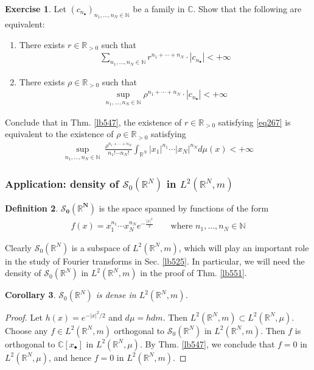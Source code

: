 \documentclass[12pt,b5paper,notitlepage]{article}
\theoremstyle{definition}
\newtheorem{df}{Definition}[subsection]
\newtheorem{exe}[df]{Exercise}
\theoremstyle{plain}
\newtheorem{co}[df]{Corollary}
\newcommand{\blt}{\bullet}
\newcommand{\Cbb}{\mathbb C}
\newcommand{\Nbb}{\mathbb N}
\newcommand{\Rbb}{\mathbb R}
\newcommand{\MS}{\mathcal S}
\numberwithin{equation}{section}
\begin{document}
\begin{exe}\label{lb554}
Let $(c_{n_\blt})_{n_1,\dots,n_N\in\Nbb}$ be a family in $\Cbb$. Show that the following are equivalent:
\begin{enumerate}[label=(\arabic*)]
\item There exists $r\in\Rbb_{>0}$ such that
\begin{align*}
\sum_{n_1,\dots,n_N\in\Nbb}r^{n_1+\cdots+n_N}\cdot |c_{n_\blt}|<+\infty
\end{align*}
\item There exists $\rho\in\Rbb_{>0}$ such that
\begin{align*}
\sup_{n_1,\dots,n_N\in\Nbb}\rho^{n_1+\cdots+n_N}\cdot |c_{n_\blt}|<+\infty
\end{align*}
\end{enumerate}
Conclude that in Thm. \ref{lb547}, the existence of $r\in\Rbb_{>0}$ satisfying \eqref{eq267} is equivalent to the existence of $\rho\in\Rbb_{>0}$ satisfying
\begin{align}
\sup_{n_1,\dots,n_N\in\Nbb}~\frac{\rho^{n_1+\cdots+n_N}}{n_1!\cdots n_N!}\int_{\Rbb^N}|x_1|^{n_1}\cdots|x_N|^{n_N}d\mu(x)<+\infty
\end{align}
\end{exe}


\subsubsection{Application: density of $\MS_0(\Rbb^N)$ in $L^2(\Rbb^N,m)$}



\begin{df}\label{lb549}
$\pmb{\MS_0(\Rbb^N)}$ \index{S0@$\MS_0(\Rbb^N)$} is the space spanned by functions of the form
\begin{align}\label{eq262}
f(x)=x_1^{n_1}\cdots x_N^{n_N}e^{-\frac{|x|^2}2}\qquad\text{where }n_1,\dots,n_N\in\Nbb
\end{align}
\end{df}


Clearly $\MS_0(\Rbb^N)$ is a subspace of $L^2(\Rbb^N,m)$, which will play an important role in the study of Fourier transforms in Sec. \ref{lb525}. In particular, we will need the density of $\MS_0(\Rbb^N)$ in $L^2(\Rbb^N,m)$ in the proof of Thm. \ref{lb551}.

\begin{co}\label{lb550}
$\MS_0(\Rbb^N)$ is dense in $L^2(\Rbb^N,m)$.
\end{co}


\begin{proof}
Let $h(x)=e^{-|x|^2/2}$ and $d\mu=hdm$. Then $L^2(\Rbb^N,m)\subset L^2(\Rbb^N,\mu)$. Choose any $f\in L^2(\Rbb^N,m)$ orthogonal to $\MS_0(\Rbb^N)$ in $L^2(\Rbb^N,m)$. Then $f$ is orthogonal to $\Cbb[x_\blt]$ in $L^2(\Rbb^N,\mu)$. By Thm. \ref{lb547}, we conclude that $f=0$ in $L^2(\Rbb^N,\mu)$, and hence $f=0$ in $L^2(\Rbb^N,m)$.
\end{proof}
\end{document}
